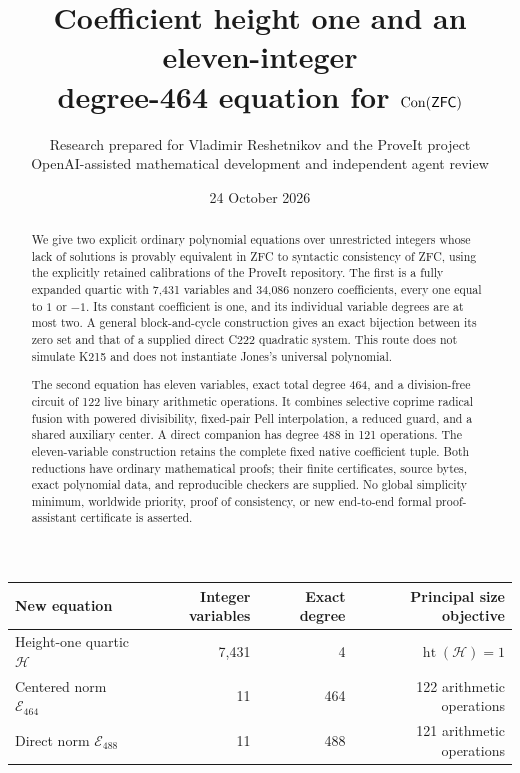 \documentclass[11pt,a4paper]{article}
\title{\vspace{-10mm}\textbf{Coefficient height one and an eleven-integer\\[3pt]
degree-464 equation for $\operatorname{Con}(\mathsf{ZFC})$}}
\author{Research prepared for Vladimir Reshetnikov and the ProveIt project\\[3pt]
\small OpenAI-assisted mathematical development and independent agent review}
\date{24 October 2026}
\theoremstyle{definition}
\theoremstyle{remark}
\newcommand{\Height}{\operatorname{ht}}
\begin{document}
\maketitle
\thispagestyle{empty}
\begin{abstract}
We give two explicit ordinary polynomial equations over unrestricted
integers whose lack of solutions is provably equivalent in ZFC to
syntactic consistency of ZFC, using the explicitly retained calibrations
of the ProveIt repository. The first is a fully expanded quartic with
7,431 variables and 34,086 nonzero coefficients, every one equal to $1$
or $-1$. Its constant coefficient is one, and its individual variable
degrees are at most two. A general block-and-cycle construction gives
an exact bijection between its zero set and that of a supplied direct
C222 quadratic system. This route does not simulate K215 and does not
instantiate Jones's universal polynomial.

The second equation has eleven variables, exact total degree 464, and
a division-free circuit of 122 live binary arithmetic operations. It
combines selective coprime radical fusion with powered divisibility,
fixed-pair Pell interpolation, a reduced guard, and a shared auxiliary
center. A direct companion has degree 488 in 121 operations. The
eleven-variable construction retains the complete fixed native
coefficient tuple. Both reductions have ordinary mathematical proofs;
their finite certificates, source bytes, exact polynomial data, and
reproducible checkers are supplied. No global simplicity minimum,
worldwide priority, proof of consistency, or new end-to-end formal
proof-assistant certificate is asserted.
\end{abstract}

\vspace{3mm}
\begin{center}
\begin{tabular}{lrrr}
\toprule
New equation & Integer variables & Exact degree & Principal size objective\\
\midrule
Height-one quartic $\mathcal H$ & 7,431 & 4 & $\Height(\mathcal H)=1$\\
Centered norm $\mathcal E_{464}$ & 11 & 464 & 122 arithmetic operations\\
Direct norm $\mathcal E_{488}$ & 11 & 488 & 121 arithmetic operations\\
\bottomrule
\end{tabular}
\end{center}

\clearpage
\tableofcontents
\clearpage
\end{document}
